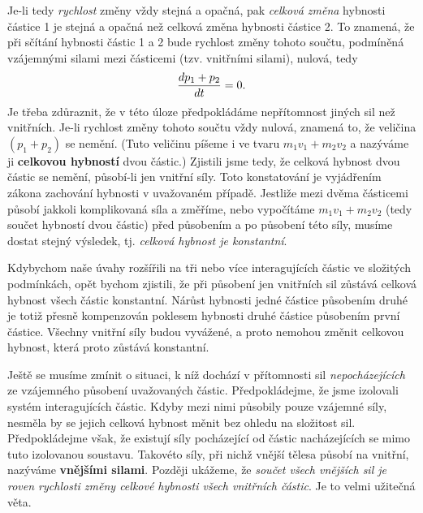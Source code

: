     Je-li tedy \emph{rychlost} změny vždy stejná a opačná, pak \emph{celková změna} hybnosti 
    částice 1 je stejná a opačná než celková změna hybnosti částice 2. To znamená, že při sčítání 
    hybnosti částic 1 a 2 bude rychlost změny tohoto součtu, podmíněná vzájemnými silami mezi 
    částicemi (tzv. vnitřními silami), nulová, tedy
    \begin{equation}\label{fyz:eq137}
      \dfrac{d p_1+p_2}{d t} = 0.
    \end{equation}
    Je třeba zdůraznit, že v této úloze předpokládáme nepřítomnost jiných sil než vnitřních. Je-li 
    rychlost změny tohoto součtu vždy nulová, znamená to, že veličina \((p_1 + p_2)\) se nemění. 
    (Tuto veličinu píšeme i ve tvaru \(m_1v_1 + m_2v_2\) a nazýváme ji \textbf{celkovou hybností} 
    dvou částic.) Zjistili jsme tedy, že celková hybnost dvou částic se nemění, působí-li jen 
    vnitřní síly. Toto konstatování je vyjádřením zákona zachování hybnosti v uvažovaném případě. 
    Jestliže mezi dvěma částicemi působí jakkoli komplikovaná síla a změříme, nebo vypočítáme 
    \(m_1v_1 + m_2v_2\) (tedy součet hybností dvou částic) před působením a po působení této síly, 
    musíme dostat stejný výsledek, tj. \emph{celková hybnost je konstantní}.
    
    Kdybychom naše úvahy rozšířili na tři nebo více interagujících částic ve složitých podmínkách, 
    opět bychom zjistili, že při působení jen vnitřních sil zůstává celková hybnost všech částic 
    konstantní. Nárůst hybnosti jedné částice působením druhé je totiž přesně kompenzován poklesem 
    hybnosti druhé částice působením první částice. Všechny vnitřní síly budou vyvážené, a proto 
    nemohou změnit celkovou hybnost, která proto zůstává konstantní.
    
    Ještě se musíme zmínit o situaci, k níž dochází v přítomnosti sil \emph{nepocházejících} ze 
    vzájemného působení uvažovaných částic. Předpokládejme, že jsme izolovali systém interagujících 
    částic. Kdyby mezi nimi působily pouze vzájemné síly, nesměla by se jejich celková hybnost 
    měnit bez ohledu na složitost sil. Předpokládejme však, že existují síly pocházející od částic 
    nacházejících se mimo tuto izolovanou soustavu. Takovéto síly, při nichž vnější tělesa působí 
    na vnitřní, nazýváme \textbf{vnějšími silami}. Později ukážeme, že \emph{součet všech vnějších 
    sil je roven rychlosti změny celkové hybnosti všech vnitřních částic}. Je to velmi užitečná 
    věta.
    
